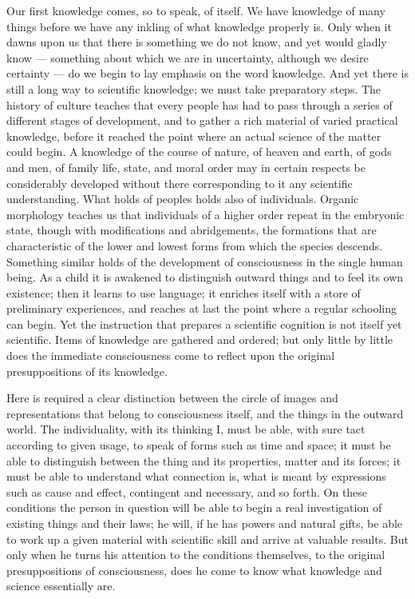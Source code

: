 \documentclass[12pt]{book}
\begin{document}
\noindent Our first knowledge comes, so to speak, of itself. We have
knowledge of many things before we have any inkling of what knowledge
properly is. Only when it dawns upon us that there is something we do not
know, and yet would gladly know --- something about which we are in
uncertainty, although we desire certainty --- do we begin to lay emphasis on
the word knowledge. And yet there is still a long way to scientific
knowledge; we must take preparatory steps. The history of culture teaches
that every people has had to pass through a series of different stages of
development, and to gather a rich material of varied practical knowledge,
before it reached the point where an actual science of the matter could
begin. A knowledge of the course of nature, of heaven and earth, of gods and
men, of family life, state, and moral order may in certain respects be
considerably developed without there corresponding to it any scientific
understanding. What holds of peoples holds also of individuals. Organic
morphology teaches us that individuals of a higher order repeat in the
embryonic state, though with modifications and abridgements, the formations
that are characteristic of the lower and lowest forms from which the species
descends. Something similar holds of the development of consciousness in the
single human being. As a child it is awakened to distinguish outward things
and to feel its own existence; then it learns to use language; it enriches
itself with a store of preliminary experiences, and reaches at last the
point where a regular schooling can begin. Yet the instruction that prepares
a scientific cognition is not itself yet scientific. Items of knowledge are
gathered and ordered; but only little by little does the immediate
consciousness come to reflect upon the original presuppositions of its
knowledge.

Here is required a clear distinction between the circle of images and
representations that belong to consciousness itself, and the things in the
outward world. The individuality, with its thinking I, must be able, with
sure tact according to given usage, to speak of forms such as time and
space; it must be able to distinguish between the thing and its properties,
matter and its forces; it must be able to understand what connection is, what
is meant by expressions such as cause and effect, contingent and necessary,
and so forth. On these conditions the person in question will be able to
begin a real investigation of existing things and their laws; he will, if he
has powers and natural gifts, be able to work up a given material with
scientific skill and arrive at valuable results. But only when he turns his
attention to the conditions themselves, to the original presuppositions of
consciousness, does he come to know what knowledge and science essentially
are.
\end{document}
